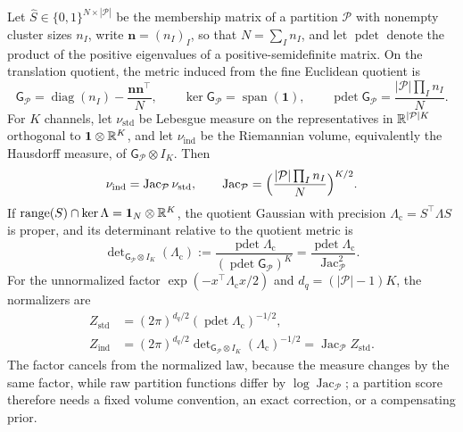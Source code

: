 Let \(\widehat S\in\{0,1\}^{N\times|\mathcal P|}\) be the membership matrix of a
partition \(\mathcal P\) with nonempty cluster sizes \(n_I\), write
\(\mathbf n=(n_I)_I\), so that \(N=\sum_In_I\), and let \(\operatorname{pdet}\)
denote the product of the positive eigenvalues of a positive-semidefinite
matrix. On the translation quotient, the metric induced from the fine Euclidean
quotient is
\begin{equation}
\mathsf G_{\mathcal P}=\operatorname{diag}(n_I)-\frac{\mathbf n\mathbf n^\top}{N},\qquad
\ker\mathsf G_{\mathcal P}=\operatorname{span}(\mathbf1),\qquad
\operatorname{pdet}\mathsf G_{\mathcal P}=\frac{|\mathcal P|\prod_In_I}{N}.
\label{eq:cg-quotient-metric}
\end{equation}
For \(K\) channels, let \(\nu_{\mathrm{std}}\) be Lebesgue measure on the
representatives in \(\mathbb R^{|\mathcal P|K}\) orthogonal to
\(\mathbf1\otimes\mathbb R^K\), and let \(\nu_{\mathrm{ind}}\) be the Riemannian volume,
equivalently the Hausdorff measure, of \(\mathsf G_{\mathcal P}\otimes I_K\).
Then
\begin{equation}
\nu_{\mathrm{ind}}=\operatorname{Jac}_{\mathcal P}\nu_{\mathrm{std}},\qquad
\operatorname{Jac}_{\mathcal P}
=\Bigl(\frac{|\mathcal P|\prod_In_I}{N}\Bigr)^{K/2}.
\label{eq:cg-quotient-jacobian}
\end{equation}
If \(\operatorname{range}(S)\cap\ker\Lambda=\mathbf1_N\otimes\mathbb R^K\), the quotient
Gaussian with precision \(\Lambda_{\mathrm c}=S^\top\Lambda S\) is proper, and its
determinant relative to the quotient metric is
\begin{equation}
\det\nolimits_{\mathsf G_{\mathcal P}\otimes I_K}(\Lambda_{\mathrm c})
:=\frac{\operatorname{pdet}\Lambda_{\mathrm c}}
{(\operatorname{pdet}\mathsf G_{\mathcal P})^K}
=\frac{\operatorname{pdet}\Lambda_{\mathrm c}}{\operatorname{Jac}_{\mathcal P}^2}.
\label{eq:cg-quotient-generalized-determinant}
\end{equation}
For the unnormalized factor \(\exp(-x^\top\Lambda_{\mathrm c}x/2)\) and
\(d_q=(|\mathcal P|-1)K\), the normalizers are
\begin{equation}
\begin{aligned}
Z_{\mathrm{std}}
&=(2\pi)^{d_q/2}
(\operatorname{pdet}\Lambda_{\mathrm c})^{-1/2},\\
Z_{\mathrm{ind}}
&=(2\pi)^{d_q/2}
\det\nolimits_{\mathsf G_{\mathcal P}\otimes I_K}(\Lambda_{\mathrm c})^{-1/2}
=\operatorname{Jac}_{\mathcal P}Z_{\mathrm{std}}.
\end{aligned}
\label{eq:cg-quotient-normalizers}
\end{equation}
The factor cancels from the normalized law, because the measure changes by the
same factor, while raw partition functions differ by
\(\log\operatorname{Jac}_{\mathcal P}\); a partition score therefore needs a
fixed volume convention, an exact correction, or a compensating prior.

